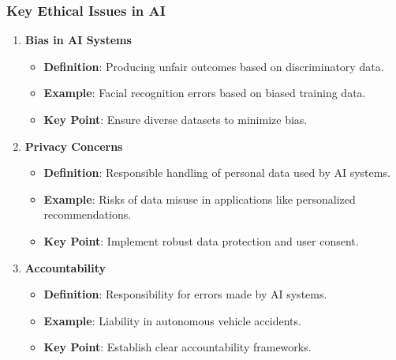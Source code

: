 \documentclass{beamer}
\begin{document}
\begin{frame}[fragile]
    \frametitle{Key Ethical Issues in AI}
    
    \begin{enumerate}
        \item \textbf{Bias in AI Systems}
        \begin{itemize}
            \item \textbf{Definition}: Producing unfair outcomes based on discriminatory data.
            \item \textbf{Example}: Facial recognition errors based on biased training data.
            \item \textbf{Key Point}: Ensure diverse datasets to minimize bias.
        \end{itemize}
        
        \item \textbf{Privacy Concerns}
        \begin{itemize}
            \item \textbf{Definition}: Responsible handling of personal data used by AI systems.
            \item \textbf{Example}: Risks of data misuse in applications like personalized recommendations.
            \item \textbf{Key Point}: Implement robust data protection and user consent.
        \end{itemize}
        
        \item \textbf{Accountability}
        \begin{itemize}
            \item \textbf{Definition}: Responsibility for errors made by AI systems.
            \item \textbf{Example}: Liability in autonomous vehicle accidents.
            \item \textbf{Key Point}: Establish clear accountability frameworks.
        \end{itemize}
    \end{enumerate}
\end{frame}
\end{document}
